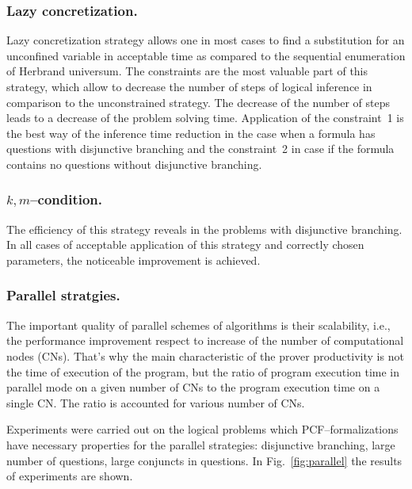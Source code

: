 \documentclass[runningheads,a4paper]{llncs}
\begin{document}
\subsubsection{Lazy concretization.}
Lazy concretization strategy allows one in most cases to find a substitution for an unconfined variable in acceptable time as compared to the sequential enumeration of Herbrand universum. The constraints are the most valuable part of this strategy, which allow to decrease the number of steps of logical inference in comparison to the unconstrained strategy. The decrease of the number of steps leads to a decrease of the problem solving time. Application of the constraint~1 is the best way of the inference time reduction in the case when a formula has questions with disjunctive branching and the constraint~2 in case if the formula contains no questions without disjunctive branching.


\subsubsection{$k,m$--condition.}
The efficiency of this strategy reveals in the problems with disjunctive branching. In all cases of acceptable application of this strategy and correctly chosen parameters, the noticeable improvement is achieved.
\subsubsection{Parallel stratgies.}
The important quality of parallel schemes of algorithms is their scalability, i.e., the performance improvement respect to increase of the number of computational nodes (CNs). That’s why the main characteristic of the prover productivity is not the time of execution of the program, but the ratio of program execution time in parallel mode on a given number of CNs to the program execution time on a single CN. The ratio is accounted for various number of CNs.

Experiments were carried out on the logical problems which PCF--formalizations have necessary properties for the parallel strategies: disjunctive branching, large number of questions, large conjuncts in questions. In Fig.~\ref{fig:parallel} the results of experiments are shown.
\end{document}
